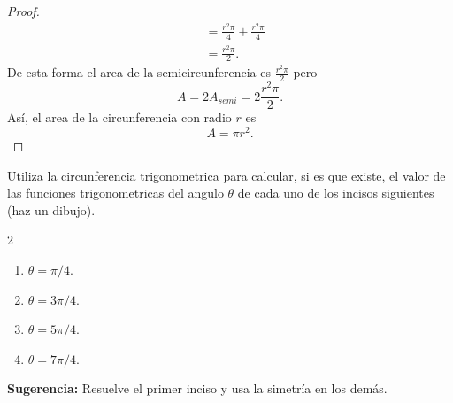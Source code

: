\documentclass[12pt,a4paper]{article}
\begin{document}
\begin{proof}
\begin{align*}
            &=\frac{r^{2}\pi}{4}+\frac{r^{2}\pi}{4}\\
            &=\frac{r^{2}\pi}{2}.
        \end{align*}
        De esta forma el area de la semicircunferencia es $\frac{r^{2}\pi}{2}$ pero
        \begin{equation*}
            A=2A_{semi}=2\frac{r^{2}\pi}{2}.
        \end{equation*}
        Así, el area de la circunferencia con radio $r$ es
        \begin{equation*}
            A=\pi r^{2}.
        \end{equation*}
    \end{proof}

    \begin{mdframed}[style=mdbluebox,frametitle={Ejercicio 4}]
        Utiliza la circunferencia trigonometrica para calcular, si es que existe, el valor de las funciones trigonometricas del angulo
        $\theta$ de cada uno de los incisos siguientes (haz un dibujo).
        \begin{multicols}{2}
            \begin{enumerate}
                \item[(a)]  $\theta=\pi/4.$
                \item[(b)]  $\theta=3\pi/4.$
                \item[(c)]  $\theta=5\pi/4.$
                \item[(d)]  $\theta=7\pi/4.$
            \end{enumerate}
        \end{multicols}
        \textbf{Sugerencia:} Resuelve el primer inciso y usa la simetría en los demás.
    \end{mdframed}
\end{document}
